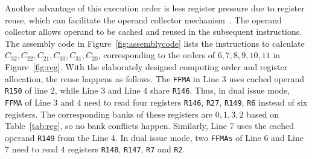 Another advantage of this execution order is less register pressure due to register reuse, which can facilitate the
operand collector mechanism~\cite{collector}. The operand collector allows operand to be cached and reused in the subsequent instructions.
The assembly code in Figure~\ref{fig:assemblycode} lists the instructions to calculate $C_{32},C_{22}, C_{21}, C_{30},
C_{31}, C_{20}$, corresponding to the orders of $6,7,8,9,10,11$ in Figure~\ref{fig:reg}.
With the elaborately designed computing order and register allocation, the reuse happens as follows. The {\tt FFMA} in
Line $3$ uses cached operand {\tt R150} of line $2$, while Line $3$ and Line $4$ share {\tt R146}. Thus, in dual issue mode,
{\tt FFMA} of Line $3$ and $4$ need to read four registers {\tt R146}, {\tt R27}, {\tt R149}, {\tt R6} instead of six
registers. The corresponding banks of these registers are $0,1,3,2$ based on Table~\ref{tab:reg}, so no bank conflicts happen.
Similarly, Line 7 uses the cached operand {\tt R149} from the Line 4. In dual issue mode, two {\tt FFMAs} of Line 6 and
Line 7 need to read $4$ registers {\tt R148}, {\tt R147}, {\tt R7} and {\tt R2}.
